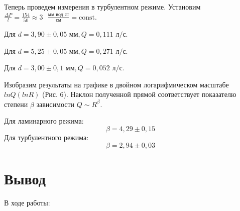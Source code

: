 \documentclass[a4paper,12pt]{article} %
\begin{document}
\medskip
\medskip

\noindent Теперь проведем измерения в турбулентном режиме. Установим $\frac{\Delta P}{l} = \frac{154}{50} \approx 3 \text{ }\frac{\text{мм вод ст}}{\text{см}} = \text{const}$. 

\medskip
\medskip

\noindent Для $d = 3,90 \pm 0,05 \text{ мм}, Q = 0,111 \text{ л/с}$.

\medskip
\medskip

\noindent Для $d = 5,25 \pm 0,05 \text{ мм}, Q = 0,271 \text{ л/с}$.

\medskip
\medskip

\noindent Для $d = 3,00 \pm 0,1 \text{ мм}, Q = 0,052 \text{ л/с}$.

\medskip
\medskip

\noindent Изобразим результаты на графике в двойном логарифмическом масштабе $lnQ (ln R)$ (Рис. 6). Наклон полученной прямой соответствует показателю степени $ \beta $ зависимости $ Q \sim R^{\beta} $.

\medskip
\medskip

\noindent Для ламинарного режима:
$$ \beta = 4,29 \pm 0,15 $$
\noindent Для турбулентного режима:
$$ \beta = 2,94 \pm 0,03 $$

\medskip
\medskip

\section{Вывод}


\noindent В ходе работы:
	
\end{document}
